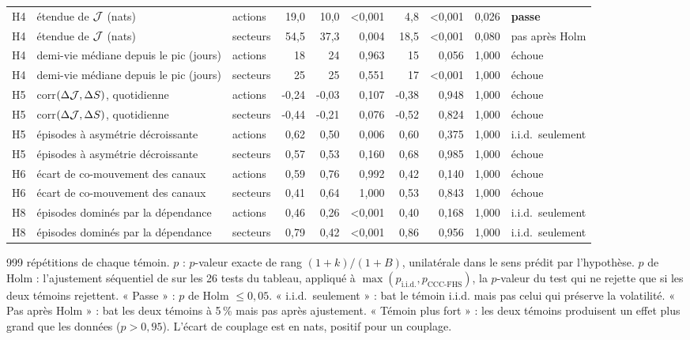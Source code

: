\begin{table}[p]
{\begin{tabular}{@{}lllrrrrrrl@{}}
H4 & étendue de $\mathcal{J}$ (nats) & actions & 19{,}0 & 10{,}0 & <0{,}001 & 4{,}8 & <0{,}001 & 0{,}026 & \textbf{passe} \\
H4 & étendue de $\mathcal{J}$ (nats) & secteurs & 54{,}5 & 37{,}3 & 0{,}004 & 18{,}5 & <0{,}001 & 0{,}080 & pas après Holm \\
H4 & demi-vie médiane depuis le pic (jours) & actions & 18 & 24 & 0{,}963 & 15 & 0{,}056 & 1{,}000 & échoue \\
H4 & demi-vie médiane depuis le pic (jours) & secteurs & 25 & 25 & 0{,}551 & 17 & <0{,}001 & 1{,}000 & échoue \\
H5 & corr$(\Delta\mathcal{J},\Delta S)$, quotidienne & actions & -0{,}24 & -0{,}03 & 0{,}107 & -0{,}38 & 0{,}948 & 1{,}000 & échoue \\
H5 & corr$(\Delta\mathcal{J},\Delta S)$, quotidienne & secteurs & -0{,}44 & -0{,}21 & 0{,}076 & -0{,}52 & 0{,}824 & 1{,}000 & échoue \\
H5 & épisodes à asymétrie décroissante & actions & 0{,}62 & 0{,}50 & 0{,}006 & 0{,}60 & 0{,}375 & 1{,}000 & i.i.d.\ seulement \\
H5 & épisodes à asymétrie décroissante & secteurs & 0{,}57 & 0{,}53 & 0{,}160 & 0{,}68 & 0{,}985 & 1{,}000 & échoue \\
H6 & écart de co-mouvement des canaux & actions & 0{,}59 & 0{,}76 & 0{,}992 & 0{,}42 & 0{,}140 & 1{,}000 & échoue \\
H6 & écart de co-mouvement des canaux & secteurs & 0{,}41 & 0{,}64 & 1{,}000 & 0{,}53 & 0{,}843 & 1{,}000 & échoue \\
H8 & épisodes dominés par la dépendance & actions & 0{,}46 & 0{,}26 & <0{,}001 & 0{,}40 & 0{,}168 & 1{,}000 & i.i.d.\ seulement \\
H8 & épisodes dominés par la dépendance & secteurs & 0{,}79 & 0{,}42 & <0{,}001 & 0{,}86 & 0{,}956 & 1{,}000 & i.i.d.\ seulement \\
\bottomrule\end{tabular}}
\par\medskip\begin{minipage}{0.95\linewidth}\footnotesize
999 répétitions de chaque témoin. $p$ : $p$-valeur exacte de rang $(1+k)/(1+B)$, unilatérale dans le sens prédit
par l'hypothèse. $p$ de Holm : l'ajustement séquentiel de \citet{holm1979} sur les 26 tests du tableau, appliqué à
$\max(p_{\text{i.i.d.}},p_{\text{CCC-FHS}})$, la $p$-valeur du test qui ne rejette que si les deux témoins rejettent. « Passe » : $p$ de Holm $\le0{,}05$.
« i.i.d.\ seulement » : bat le témoin i.i.d. mais pas celui qui préserve la volatilité. « Pas après Holm » : bat les deux témoins à 5\,\% mais pas après ajustement.
« Témoin plus fort » : les deux témoins produisent un effet plus grand que les données ($p>0{,}95$). L'écart de couplage est en nats, positif pour un couplage.
\end{minipage}
\end{table}

